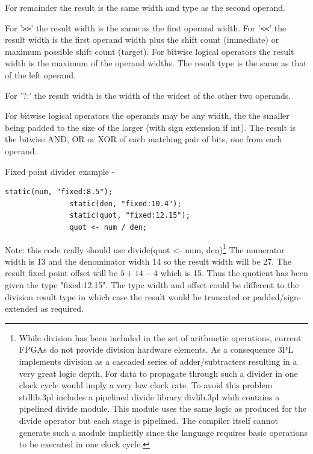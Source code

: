             For remainder the result is the same width and type as the second
            operand.

            For '\verb'>>'' the result width is the same as the first operand
            width. For '\verb'<<'' the result width is the first operand width
            plus the shift count (immediate) or maximum possible shift count
            (target). For bitwise logical operators the result width is the
            maximum of the operand widths. The result type is the same as that
            of the left operand.

            For '?:' the result width is the width of the widest of the other
            two operands.

            For bitwise logical operators the operands may be any width, the the
            smaller being padded to the size of the larger (with sign extension
            if int). The result is the bitwise AND, OR or XOR of each matching
            pair of bits, one from each operand.
            
            Fixed point divider example -
            \begin{lstlisting}[gobble=12, language=threepl]
               static(num, "fixed:8.5");
               static(den, "fixed:10.4");
               static(quot, "fixed:12.15");
               quot <- num / den;
            \end{lstlisting}
            Note: this code really should use divide(quot <- num, den)\footnote{
            While division has been included in the set of arithmetic
            operations, current FPGAs do not provide division hardware elements.
            As a consequence 3PL implements division as a cascaded series of
            adder/subtracters resulting in a very great logic depth. For data to
            propagate through such a divider in one clock cycle would imply a
            very low clock rate. To avoid this problem stdlib.3pl includes a
            pipelined divide library divlib.3pl whih contains a pipelined divide
            module. This module uses the same logic as produced for the divide
            operator but each stage is pipelined. The compiler itself cannot
            generate such a module implicitly since the language requires basic
            operations to be executed in one clock cycle. } 
            The numerator width is 13 and the denominator width 14 so the result
            width will be 27. The result fixed point offset will be $5 + 14 - 4$
            which is 15. Thus the quotient has been given the type
            "fixed:12.15". The type width and offset could be different to the
            division result type in which case the result would be truncated or
            padded/sign-extended as required.
            
